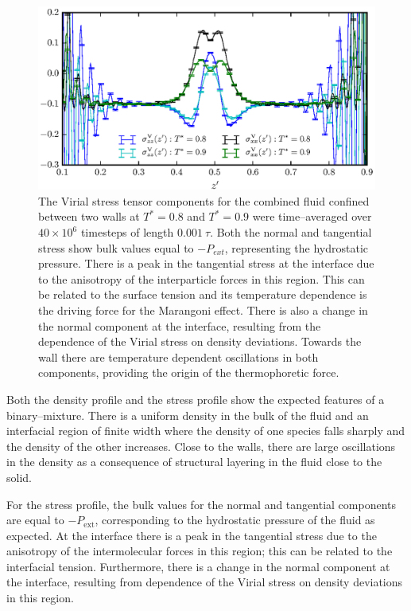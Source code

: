 \begin{figure}[h]
\centering
\includegraphics[scale=1.0]{PisVirStress}
\caption{The Virial stress tensor components for the combined fluid confined between two walls at $T^{*} = 0.8$ and $T^{*} = 0.9$ were time--averaged over $40 \times 10^{6}$ timesteps of length $0.001\ \tau$.
Both the normal and tangential stress show bulk values equal to $-P_{ext}$, representing the hydrostatic pressure.
There is a peak in the tangential stress at the interface due to the anisotropy of the interparticle forces in this region.
This can be related to the surface tension and its temperature dependence is the driving force for the Marangoni effect.
There is also a change in the normal component at the interface, resulting from the dependence of the Virial stress on density deviations.
Towards the wall there are temperature dependent oscillations in both components, providing the origin of the thermophoretic force.
}
\label{PisVirStress}
\end{figure}

Both the density profile and the stress profile show the expected features of a binary--mixture. 
There is a uniform density in the bulk of the fluid and an interfacial region of finite width where the density of one species falls sharply and the density of the other increases.
Close to the walls, there are large oscillations in the density as a consequence of structural layering in the fluid close to the solid.

For the stress profile, the bulk values for the normal and tangential components are equal to $-P_{\mathrm{ext}}$, corresponding to the hydrostatic pressure of the fluid as expected.
At the interface there is a peak in the tangential stress due to the anisotropy of the intermolecular forces in this region; this can be related to the interfacial tension.\cite{Marchand2011}
Furthermore, there is a change in the normal component at the interface, resulting from dependence of the Virial stress on density deviations in this region.

